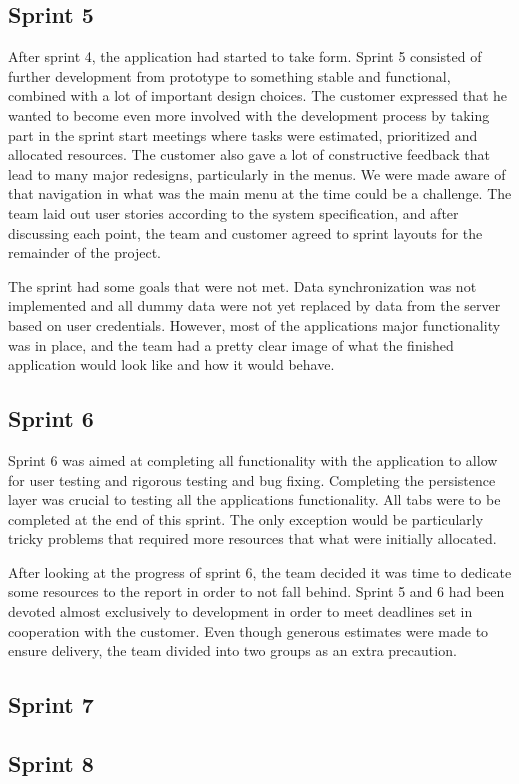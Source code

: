 \subsection{Sprint 5}
After sprint 4, the application had started to take form. Sprint 5 consisted of further development from prototype to something stable and functional, combined with a lot of important design choices. The customer expressed that he wanted to become even more involved with the development process by taking part in the sprint start meetings where tasks were estimated, prioritized and allocated resources. The customer also gave a lot of constructive feedback that lead to many major redesigns, particularly in the menus. We were made aware of that navigation in what was the main menu at the time could be a challenge. The team laid out user stories according to the system specification, and after discussing each point, the team and customer agreed to sprint layouts for the remainder of the project.

The sprint had some goals that were not met. Data synchronization was not implemented and all dummy data were not yet replaced by data from the server based on user credentials. However, most of the applications major functionality was in place, and the team had a pretty clear image of what the finished application would look like and how it would behave.

\subsection{Sprint 6}
Sprint 6 was aimed at completing all functionality with the application to allow for user testing and rigorous testing and bug fixing. Completing the persistence layer was crucial to testing all the applications functionality. All tabs were to be completed at the end of this sprint. The only exception would be particularly tricky problems that required more resources that what were initially allocated.

After looking at the progress of sprint 6, the team decided it was time to dedicate some resources to the report in order to not fall behind. Sprint 5 and 6 had been devoted almost exclusively to development in order to meet deadlines set in cooperation with the customer. Even though generous estimates were made to ensure delivery, the team divided into two groups as an extra precaution. 

\subsection{Sprint 7}

\subsection{Sprint 8}
